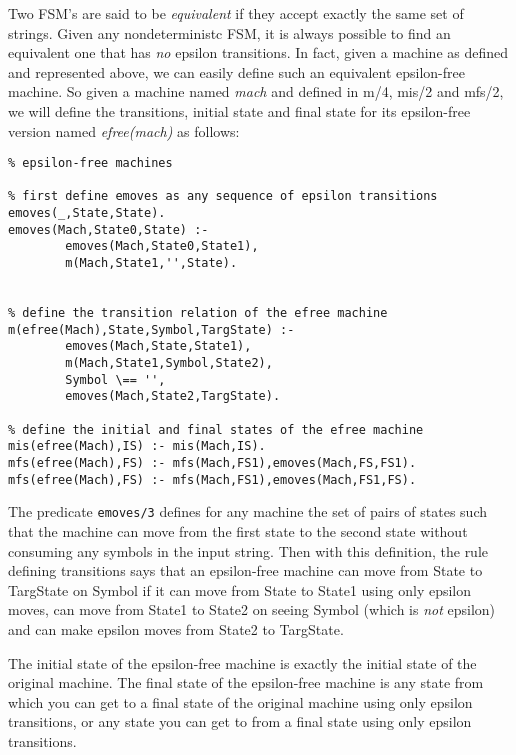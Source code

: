 Two FSM's are said to be {\em equivalent} if they accept exactly the
same set of strings.  Given any nondeterministc FSM, it is always
possible to find an equivalent one that has {\em no} epsilon
transitions.  In fact, given a machine as defined and represented
above, we can easily define such an equivalent epsilon-free machine.
So given a machine named {\em mach} and defined in m/4, mis/2 and
mfs/2, we will define the transitions, initial state and final state
for its epsilon-free version named {\em efree(mach)} as follows:

\begin{verbatim}
% epsilon-free machines

% first define emoves as any sequence of epsilon transitions
emoves(_,State,State).
emoves(Mach,State0,State) :-
        emoves(Mach,State0,State1),
        m(Mach,State1,'',State).


% define the transition relation of the efree machine
m(efree(Mach),State,Symbol,TargState) :-
        emoves(Mach,State,State1),
        m(Mach,State1,Symbol,State2),
        Symbol \== '',
        emoves(Mach,State2,TargState).

% define the initial and final states of the efree machine
mis(efree(Mach),IS) :- mis(Mach,IS).
mfs(efree(Mach),FS) :- mfs(Mach,FS1),emoves(Mach,FS,FS1).
mfs(efree(Mach),FS) :- mfs(Mach,FS1),emoves(Mach,FS1,FS).
\end{verbatim}

The predicate \verb|emoves/3| defines for any machine the set of pairs
of states such that the machine can move from the first state to the
second state without consuming any symbols in the input string.  Then
with this definition, the rule defining transitions says that an
epsilon-free machine can move from State to TargState on Symbol if it
can move from State to State1 using only epsilon moves, can move from
State1 to State2 on seeing Symbol (which is {\em not} epsilon) and can
make epsilon moves from State2 to TargState.

The initial state of the epsilon-free machine is exactly the initial
state of the original machine.  The final state of the epsilon-free
machine is any state from which you can get to a final state of the
original machine using only epsilon transitions, or any state you can
get to from a final state using only epsilon transitions.

